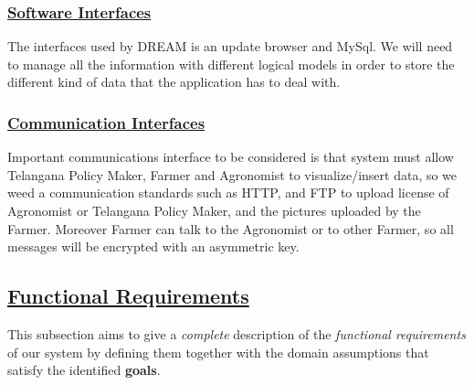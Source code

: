 	\subsubsection[Software Interfaces]{\hyperlink{toc}{Software Interfaces}}
	The interfaces used by DREAM is an update browser and MySql. We will need to manage all the information with different logical models in order to store the different kind of data that the application has to deal with.
		
	\subsubsection[Communication Interfaces]{\hyperlink{toc}{Communication Interfaces}}
	Important communications interface to be considered is that system must allow Telangana Policy Maker, Farmer and Agronomist to visualize/insert data, so we weed a communication standards such as HTTP, and FTP to upload license of Agronomist or Telangana Policy Maker, and the pictures uploaded by the Farmer. Moreover Farmer can talk to the Agronomist or to other Farmer, so all messages will be encrypted with an asymmetric key.
		
	\newpage

\subsection[Functional Requirements]{\hyperlink{toc}{Functional Requirements}}
	\label{sec:functionalRequirements}
	This subsection aims to give a \emph{complete} description of the \emph{functional requirements} of our system by defining them together with the domain assumptions that satisfy the identified \textbf{goals}.
	
